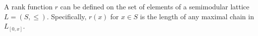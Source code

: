 A rank function $r$ can be defined on the set of elements of a semimodular lattice $L = (S, \leq)$. Specifically, $r(x)$ for $x \in S$ is the length of any maximal chain in $L_{[0,x]}$.

